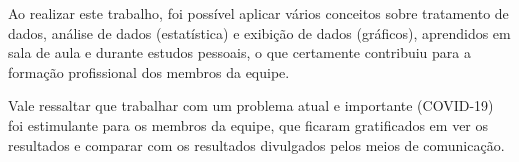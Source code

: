 Ao realizar este trabalho, foi possível aplicar vários conceitos sobre tratamento de dados, análise de dados (estatística) e exibição de dados (gráficos), aprendidos em sala de aula e durante estudos pessoais, o que certamente contribuiu para a formação profissional dos membros da equipe. 

Vale ressaltar que trabalhar com um problema atual e importante (COVID-19) foi estimulante para os membros da equipe, que ficaram gratificados em ver os resultados e comparar com os resultados divulgados pelos meios de comunicação.